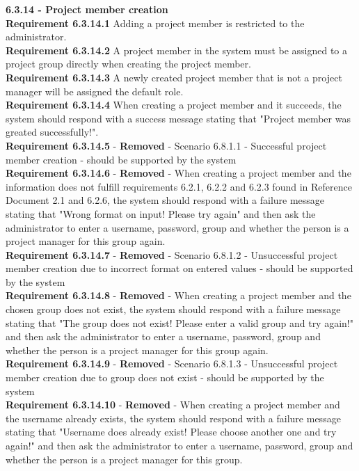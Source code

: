 \documentclass{article}
\begin{document}
{\fontsize{11}{11}\selectfont \noindent\textbf{6.3.14 - Project member creation}} \\
\noindent\textbf{Requirement 6.3.14.1} Adding a project member is restricted to the administrator. \\
\textbf{Requirement 6.3.14.2} A project member in the system must be assigned to a project group directly when creating the project member. \\
\textbf{Requirement 6.3.14.3} A newly created project member that is not a project manager will be assigned the default role. \\
\textbf{Requirement 6.3.14.4} When creating a project member and it succeeds, the system should respond with a success message stating that "Project member was greated successfully!".\\ 
\textbf{Requirement 6.3.14.5} - \textbf{Removed} - Scenario 6.8.1.1 - Successful project member creation - should be supported by the system \\
\textbf{Requirement 6.3.14.6} - \textbf{Removed} - When creating a project member and the information does not fulfill requirements 6.2.1, 6.2.2 and 6.2.3 found in Reference Document 2.1 and 6.2.6, the system should respond with a failure message stating that "Wrong format on input! Please try again" and then ask the administrator to enter a username, password, group and whether the person is a project manager for this group again.\\
\textbf{Requirement 6.3.14.7} - \textbf{Removed} - Scenario 6.8.1.2 - Unsuccessful project member creation due to incorrect format on entered values - should be supported by the system \\
\textbf{Requirement 6.3.14.8} - \textbf{Removed} - When creating a project member and the chosen group does not exist, the system should respond with a failure message stating that "The group does not exist! Please enter a valid group and try again!" and then ask the administrator to enter a username, password, group and whether the person is a project manager for this group again.\\
\textbf{Requirement 6.3.14.9} - \textbf{Removed} - Scenario 6.8.1.3 - Unsuccessful project member creation due to group does not exist - should be supported by the system \\
\textbf{Requirement 6.3.14.10} - \textbf{Removed} - When creating a project member and the username already exists, the system should respond with a failure message stating that "Username does already exist! Please choose another one and try again!" and then ask the administrator to enter a username, password, group and whether the person is a project manager for this group.\\
\end{document}
